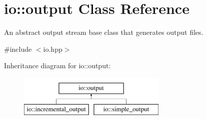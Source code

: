 \hypertarget{classio_1_1output}{\section{io\-:\-:output Class Reference}
\label{classio_1_1output}
}


An abstract output stream base class that generates output files.  




{\ttfamily \#include $<$io.\-hpp$>$}

Inheritance diagram for io\-:\-:output\-:\begin{figure}[H]
\begin{center}
\leavevmode
\includegraphics[height=2.000000cm]{classio_1_1output}
\end{center}
\end{figure}
